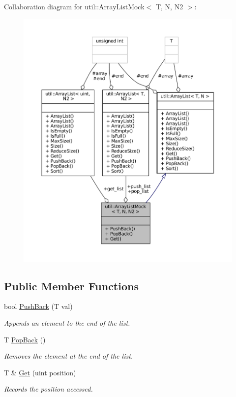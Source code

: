 Collaboration diagram for util\+:\+:Array\+List\+Mock$<$ T, N, N2 $>$\+:
\nopagebreak
\begin{figure}[H]
\begin{center}
\leavevmode
\includegraphics[width=350pt]{classutil_1_1ArrayListMock__coll__graph}
\end{center}
\end{figure}
\subsection*{Public Member Functions}
\begin{DoxyCompactItemize}
\item 
bool \hyperlink{classutil_1_1ArrayListMock_a6acf1a3166dae9970700218916560955}{Push\+Back} (T val)
\begin{DoxyCompactList}\small\item\em Appends an element to the end of the list. \end{DoxyCompactList}\item 
T \hyperlink{classutil_1_1ArrayListMock_ac6244094b159f4ab8986bf865afa90ff}{Pop\+Back} ()
\begin{DoxyCompactList}\small\item\em Removes the element at the end of the list. \end{DoxyCompactList}\item 
T \& \hyperlink{classutil_1_1ArrayListMock_a84e20a60cd0268edafb36b88c0895b71}{Get} (uint position)
\begin{DoxyCompactList}\small\item\em Records the position accessed. \end{DoxyCompactList}\end{DoxyCompactItemize}
